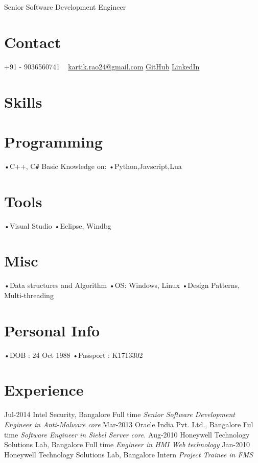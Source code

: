\documentclass[]{kartikkumar-cv}
\begin{document}
       {Senior Software Development Engineer}
          
\begin{aside}
  \section{Contact}
    +91 - 9036560741
    ~
    \href{mailto:kartik.rao24@gmail.com}{kartik.rao24@gmail.com}
    \href{https://github.com/raokartikkumar24}{GitHub}
    \href{https://in.linkedin.com/in/raokartikkumar}{LinkedIn}
    ~
  \section{Skills}
  \section{Programming}
   •C++, C\texttt{\#}
   Basic Knowledge on:
   •Python,Javscript,Lua
    ~
    \section{Tools}
    •Visual Studio
    •Eclipse, Windbg
    \section{Misc}
   •Data structures and Algorithm
   •OS: Windows, Linux
   •Design Patterns, Multi-threading
   ~
   \section{Personal Info}
   •DOB : 24 Oct 1988
   •Passport : K1713302
   ~
\end{aside}

\section{Experience}

\begin{entrylist}
  \entry
    {Jul-2014}
    {Intel Security, Bangalore}
    {Full time}
    {\emph{Senior Software Development Engineer in Anti-Malware core}}
  \entry
    {Mar-2013}
    {Oracle India Pvt. Ltd., Bangalore}
    {Ful time}
    {\emph{Software Engineer in Siebel Server core.}}
  \entry
    {Aug-2010}
    {Honeywell Technology Solutions Lab, Bangalore}
    {Full time}
    {\emph{Engineer in HMI Web technology}}
   \entry
   {Jan-2010}
   {Honeywell Technology Solutions Lab, Bangalore}
   {Intern}
   {\emph{Project Trainee in FMS} }
\end{entrylist}
\end{document}
